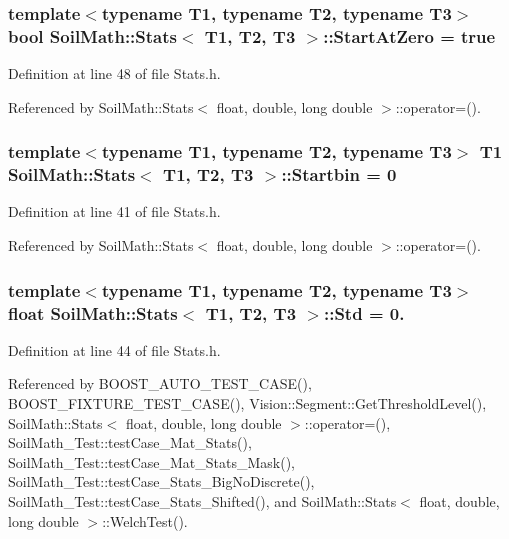 \subsubsection[{Start\+At\+Zero}]{\setlength{\rightskip}{0pt plus 5cm}template$<$typename T1, typename T2, typename T3$>$ bool {\bf Soil\+Math\+::\+Stats}$<$ T1, T2, T3 $>$\+::Start\+At\+Zero = true}\label{class_soil_math_1_1_stats_a06f5e8404c2a0fa303dbb18a58d6deb5}


Definition at line 48 of file Stats.\+h.



Referenced by Soil\+Math\+::\+Stats$<$ float, double, long double $>$\+::operator=().

\hypertarget{class_soil_math_1_1_stats_acf54f4a105482109ebc884c8e56d0ba9}{}
\subsubsection[{Startbin}]{\setlength{\rightskip}{0pt plus 5cm}template$<$typename T1, typename T2, typename T3$>$ T1 {\bf Soil\+Math\+::\+Stats}$<$ T1, T2, T3 $>$\+::Startbin = 0}\label{class_soil_math_1_1_stats_acf54f4a105482109ebc884c8e56d0ba9}


Definition at line 41 of file Stats.\+h.



Referenced by Soil\+Math\+::\+Stats$<$ float, double, long double $>$\+::operator=().

\hypertarget{class_soil_math_1_1_stats_a6af590b7d033d882d5428c0d7a1f5e59}{}
\subsubsection[{Std}]{\setlength{\rightskip}{0pt plus 5cm}template$<$typename T1, typename T2, typename T3$>$ float {\bf Soil\+Math\+::\+Stats}$<$ T1, T2, T3 $>$\+::Std = 0.}\label{class_soil_math_1_1_stats_a6af590b7d033d882d5428c0d7a1f5e59}


Definition at line 44 of file Stats.\+h.



Referenced by B\+O\+O\+S\+T\+\_\+\+A\+U\+T\+O\+\_\+\+T\+E\+S\+T\+\_\+\+C\+A\+S\+E(), B\+O\+O\+S\+T\+\_\+\+F\+I\+X\+T\+U\+R\+E\+\_\+\+T\+E\+S\+T\+\_\+\+C\+A\+S\+E(), Vision\+::\+Segment\+::\+Get\+Threshold\+Level(), Soil\+Math\+::\+Stats$<$ float, double, long double $>$\+::operator=(), Soil\+Math\+\_\+\+Test\+::test\+Case\+\_\+\+Mat\+\_\+\+Stats(), Soil\+Math\+\_\+\+Test\+::test\+Case\+\_\+\+Mat\+\_\+\+Stats\+\_\+\+Mask(), Soil\+Math\+\_\+\+Test\+::test\+Case\+\_\+\+Stats\+\_\+\+Big\+No\+Discrete(), Soil\+Math\+\_\+\+Test\+::test\+Case\+\_\+\+Stats\+\_\+\+Shifted(), and Soil\+Math\+::\+Stats$<$ float, double, long double $>$\+::\+Welch\+Test().

